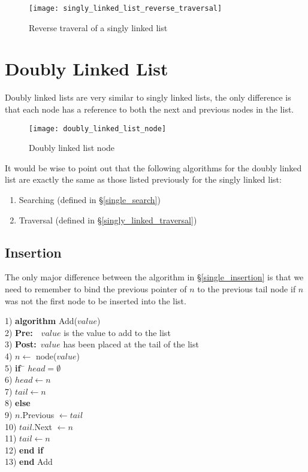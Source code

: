 \begin{figure}
\begin{center}
\texttt{[image: singly\_linked\_list\_reverse\_traversal]}
\end{center}
\caption{Reverse traveral of a singly linked list} \label{fig:singly_linked_list_reverse_traversal}
\end{figure}

\section{Doubly Linked List} \label{doubly_linked_list}
Doubly linked lists are very similar to singly linked lists, the only difference is that each node has a reference to both the next and previous nodes in the list.

\begin{figure}
\begin{center}
\texttt{[image: doubly\_linked\_list\_node]}
\end{center}
\caption{Doubly linked list node}
\end{figure}


It would be wise to point out that the following algorithms for the doubly linked list are exactly the same as those listed previously for the singly linked list:

\begin{enumerate}
\item Searching (defined in \S\ref{single_search})
\item Traversal (defined in \S\ref{singly_linked_traversal})
\end{enumerate}

\subsection{Insertion}
The only major difference between the algorithm in \S\ref{single_insertion} is that we need to remember to bind the previous pointer of $n$ to the previous tail node if $n$ was not the first node to be inserted into the list.

\begin{tabbing}
1)  \textbf{alg}\= \textbf{orithm} Add($value$) \\
2)  \> \textbf{Pre:}~~$value$ is the value to add to the list \\
3)  \> \textbf{Post:}~$value$ has been placed at the tail of the list \\
4)  \> $n \leftarrow$ node($value$) \\
5)  \> \textbf{if}~\= $head = \emptyset$ \\
6)  \> \> $head \leftarrow n$ \\
7)  \> \> $tail \leftarrow n$ \\
8)  \> \textbf{else} \\
9)  \> \> $n$.Previous $\leftarrow tail$ \\
10) \> \> $tail$.Next $\leftarrow n$ \\
11) \> \> $tail \leftarrow n$ \\
12) \> \textbf{end if} \\
13) \textbf{end} Add \\
\end{tabbing}

